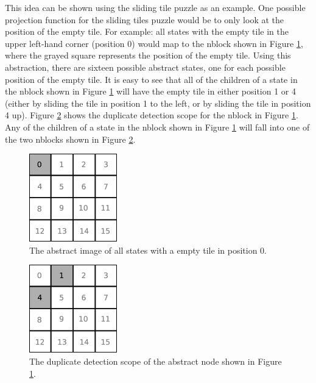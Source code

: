 \documentclass{article}
\begin{document}
This idea can be shown using the sliding tile puzzle as an example.
One possible projection function for the sliding tiles puzzle would be
to only look at the position of the empty tile.  For example: all
states with the empty tile in the upper left-hand corner (position 0)
would map to the nblock shown in Figure \ref{fig:tile-abstraction},
where the grayed square represents the position of the empty tile.
Using this abstraction, there are sixteen possible abstract states,
one for each possible position of the empty tile.  It is easy to see
that all of the children of a state in the nblock shown in Figure
\ref{fig:tile-abstraction} will have the empty tile in either position
1 or 4 (either by sliding the tile in position 1 to the left, or by
sliding the tile in position 4 up).  Figure
\ref{fig:duplicate-detection-scope} shows the duplicate detection
scope for the nblock in Figure \ref{fig:tile-abstraction}.  Any of the
children of a state in the nblock shown in Figure
\ref{fig:tile-abstraction} will fall into one of the two nblocks shown
in Figure \ref{fig:duplicate-detection-scope}.

\begin{figure}[t]
\begin{center}
\includegraphics[width=1.5in]{images/tile-abstraction.eps}
\caption{The abstract image of all states with a empty tile in
  position 0.}
\label{fig:tile-abstraction}
\end{center}
\end{figure}

\begin{figure}[t]
\begin{center}
\includegraphics[width=1.5in]{images/duplicate-detection-scope.eps}
\caption{The duplicate detection scope of the abstract node shown in
  Figure \ref{fig:tile-abstraction}.}
\label{fig:duplicate-detection-scope}
\end{center}
\end{figure}
\end{document}
